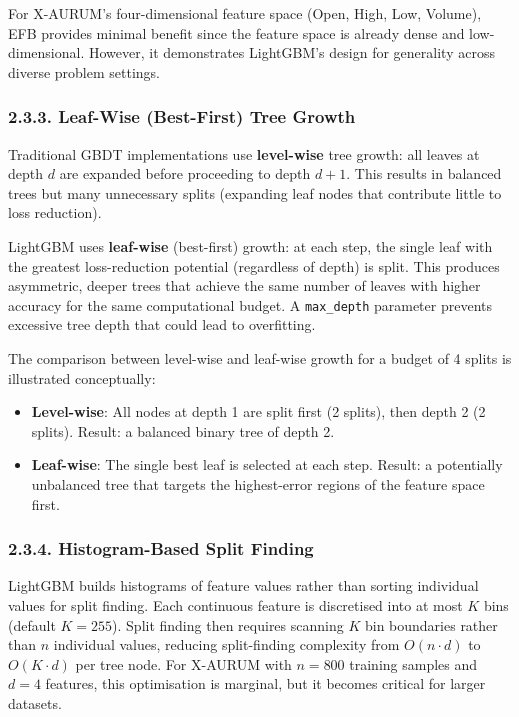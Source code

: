 For X-AURUM's four-dimensional feature space (Open, High, Low, Volume), EFB provides minimal benefit since the feature space is already dense and low-dimensional. However, it demonstrates LightGBM's design for generality across diverse problem settings.

\subsubsection{2.3.3. Leaf-Wise (Best-First) Tree Growth}
Traditional GBDT implementations use \textbf{level-wise} tree growth: all leaves at depth $d$ are expanded before proceeding to depth $d+1$. This results in balanced trees but many unnecessary splits (expanding leaf nodes that contribute little to loss reduction).

LightGBM uses \textbf{leaf-wise} (best-first) growth: at each step, the single leaf with the greatest loss-reduction potential (regardless of depth) is split. This produces asymmetric, deeper trees that achieve the same number of leaves with higher accuracy for the same computational budget. A \texttt{max\_depth} parameter prevents excessive tree depth that could lead to overfitting.

The comparison between level-wise and leaf-wise growth for a budget of 4 splits is illustrated conceptually:

\begin{itemize}
  \item \textbf{Level-wise}: All nodes at depth 1 are split first (2 splits), then depth 2 (2 splits). Result: a balanced binary tree of depth 2.
  \item \textbf{Leaf-wise}: The single best leaf is selected at each step. Result: a potentially unbalanced tree that targets the highest-error regions of the feature space first.
\end{itemize}

\subsubsection{2.3.4. Histogram-Based Split Finding}
LightGBM builds histograms of feature values rather than sorting individual values for split finding. Each continuous feature is discretised into at most $K$ bins (default $K=255$). Split finding then requires scanning $K$ bin boundaries rather than $n$ individual values, reducing split-finding complexity from $O(n \cdot d)$ to $O(K \cdot d)$ per tree node. For X-AURUM with $n=800$ training samples and $d=4$ features, this optimisation is marginal, but it becomes critical for larger datasets.

